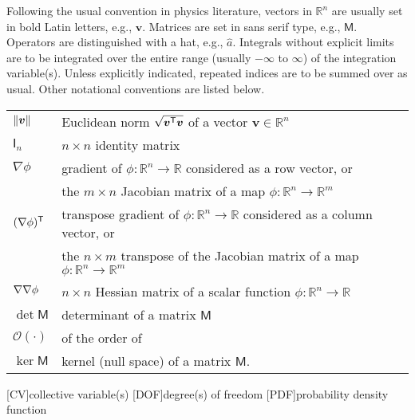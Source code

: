 
Following the usual convention in physics literature, vectors in $\mathbb{R}^{n}$ are usually set in bold Latin letters, e.g., $\bm{v}$.
Matrices are set in \textsf{sans serif} type, e.g., $\mathsf{M}$.
Operators are distinguished with a hat, e.g., $\hat{a}$.
Integrals without explicit limits are to be integrated over the entire range (usually $-\infty$ to $\infty$) of the integration variable(s).
Unless explicitly indicated, repeated indices are to be summed over as usual.
Other notational conventions are listed below.\\

\begin{tabular}{ll}
  $\lVert\bm{v}\rVert$ & Euclidean norm $\sqrt{\bm{v}^\mathsf{T}\bm{v}}$ of a vector $\bm{v} \in \mathbb{R}^{n}$\\
  $\mathsf{I}_n$ & $n\times n$ identity matrix\\
  $\nabla \phi$ & gradient of $\phi: \mathbb{R}^n \to \mathbb{R}$ considered as a row vector, or\\
                & the $m\times n$ Jacobian matrix of a map $\phi: \mathbb{R}^n \to \mathbb{R}^m$\\
  $(\nabla\phi)^\mathsf{T}$ & transpose gradient of $\phi: \mathbb{R}^n \to \mathbb{R}$ considered as a column vector, or\\
                & the $n\times m$ transpose of the Jacobian matrix of a map $\phi: \mathbb{R}^n \to \mathbb{R}^m$\\
  $\nabla\nabla \phi$ & $n\times n$ Hessian matrix of a scalar function $\phi: \mathbb{R}^n \to \mathbb{R}$\\
  $\det\mathsf{M}$ & determinant of a matrix $\mathsf{M}$\\
  $\mathcal{O}(\cdot)$ & of the order of\\
  $\ker\mathsf{M}$ & kernel (null space) of a matrix $\mathsf{M}$.
\end{tabular}

[CV]{collective variable(s)}
[DOF]{degree(s) of freedom}
[PDF]{probability density function}
